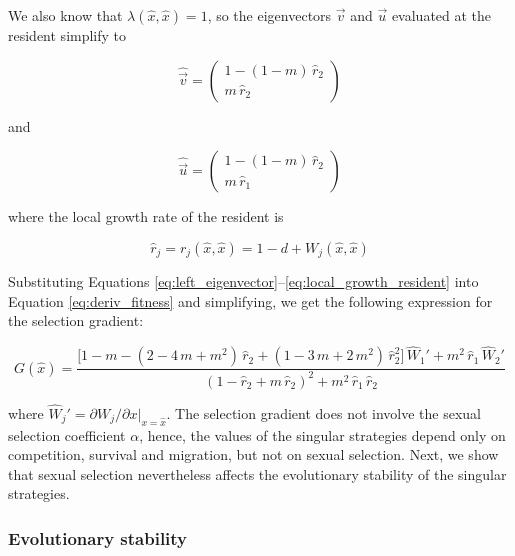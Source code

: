 We also know that $\lambda(\hat{x}, \hat{x}) = 1$, so the eigenvectors $\overrightarrow{v}$ and $\overrightarrow{u}$ evaluated at the resident simplify to

\begin{equation}
    \hat{\overrightarrow{v}} = 
    \begin{pmatrix}
        1 - (1-m)\,\hat{r}_2\\
        m \, \hat{r}_2
    \end{pmatrix}
    \label{eq:left_eigenvector_resident}
\end{equation}

and

\begin{equation}
    \hat{\overrightarrow{u}} = 
    \begin{pmatrix}
        1 - (1-m)\,\hat{r}_2\\
        m \, \hat{r}_1
    \end{pmatrix}
    \label{eq:right_eigenvector_resident}
\end{equation}

where the local growth rate of the resident is

\begin{equation}
    \hat{r}_j = r_j(\hat{x}, \hat{x}) = 1 - d + W_j(\hat{x}, \hat{x})
    \label{eq:local_growth_resident}
\end{equation}

Substituting Equations \ref{eq:left_eigenvector}--\ref{eq:local_growth_resident} into Equation \ref{eq:deriv_fitness} and simplifying, we get the following expression for the selection gradient:

\begin{equation}
    G(\hat{x}) = \frac{\big[1-m-(2-4\,m+m^2)\,\hat{r}_2+(1-3\,m+2\,m^2)\,\hat{r}^2_2\big]\, \hat{W}_1' + m^2\,\hat{r}_1\,\hat{W}_2'}{(1-\hat{r}_2+m\,\hat{r}_2)^2 + m^2\,\hat{r}_1\,\hat{r}_2}
    \label{eq:fitness_gradient_expression}
\end{equation}

where $\hat{W}_j' = \partial W_j / \partial x |_{x = \hat{x}}$. The selection gradient does not involve the sexual selection coefficient $\alpha$, hence, the values of the singular strategies depend only on competition, survival and migration, but not on sexual selection. Next, we show that sexual selection nevertheless affects the evolutionary stability of the singular strategies.

\subsubsection*{Evolutionary stability}

